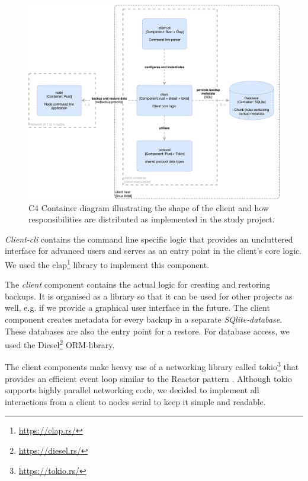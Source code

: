 \begin{figure}[h]
	\centering
	\includegraphics[width=1\linewidth]{resources/c4-client-container}
	\caption[Client specific C4 Container diagram]{C4 Container diagram illustrating the shape of the \gls{client} and how responsibilities are distributed as implemented in the study project.}
	\label{fig:c4-client-container}
\end{figure}

\emph{Client-cli} contains the command line specific logic that provides an uncluttered interface for advanced users and serves as an entry point in the client's core logic. We used the clap\footnote{\url{https://clap.rs/}}  library to implement this component.

The \emph{client} component contains the actual logic for creating and restoring backups. It is organised as a library so that it can be used for other projects as well, e.g. if we provide a graphical user interface in the future. The \gls{client} component creates metadata for every backup in a separate \emph{SQlite-database}. These databases are also the entry point for a restore. For database access, we used the Diesel\footnote{\url{https://diesel.rs/}} ORM-library.

The \gls{client} components make heavy use of a networking library called tokio\footnote{\url{https://tokio.rs/}} that provides an efficient event loop similar to the Reactor pattern \cite{POSA1}. Although tokio supports highly parallel networking code, we decided to implement all interactions from a \gls{client} to \glspl{node} serial to keep it simple and readable.

